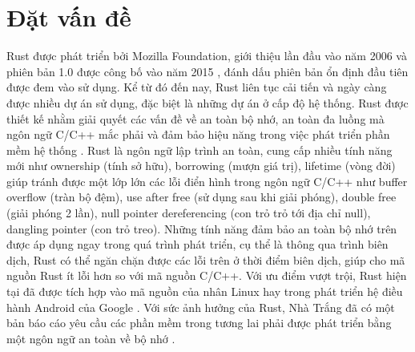 \chapter{Đặt vấn đề}
\label{chap:introduction}

Rust được phát triển bởi Mozilla Foundation, giới thiệu lần đầu vào năm 2006 và phiên bản 1.0 được công bố vào năm 2015 \cite{seidel2024bringing}, đánh dấu phiên bản ổn định đầu tiên được đem vào sử dụng.
Kể từ đó đến nay, Rust liên tục cải tiến và ngày càng được nhiều dự án sử dụng, đặc biệt là những dự án ở cấp độ hệ thống.
Rust được thiết kế nhằm giải quyết các vấn đề về an toàn bộ nhớ, an toàn đa luồng mà ngôn ngữ C/C++ mắc phải và đảm bảo hiệu năng trong việc phát triển phần mềm hệ thống \cite{je2020scientists, stackoverflowStackOverflow}.
Rust là ngôn ngữ lập trình an toàn, cung cấp nhiều tính năng mới như ownership (tính sở hữu), borrowing (mượn giá trị), lifetime (vòng đời) giúp tránh được một lớp lớn các lỗi điển hình trong ngôn ngữ C/C++ như buffer overflow (tràn bộ đệm), use after free (sử dụng sau khi giải phóng), double free (giải phóng 2 lần), null pointer dereferencing (con trỏ trỏ tới địa chỉ null), dangling pointer (con trỏ treo).
Những tính năng đảm bảo an toàn bộ nhớ trên được áp dụng ngay trong quá trình phát triển, cụ thể là thông qua trình biên dịch, Rust có thể ngăn chặn được các lỗi trên ở thời điểm biên dịch, giúp cho mã nguồn Rust ít lỗi hơn so với mã nguồn C/C++.
Với ưu điểm vượt trội, Rust hiện tại đã được tích hợp vào mã nguồn của nhân Linux \cite{kernelRustx2014} hay trong phát triển hệ điều hành Android của Google \cite{androidAndroidRust, googleblogMemorySafe}.
Với sức ảnh hưởng của Rust, Nhà Trắng đã có một bản báo cáo yêu cầu các phần mềm trong tương lai phải được phát triển bằng một ngôn ngữ an toàn về bộ nhớ \cite{whitehousePressRelease}.

